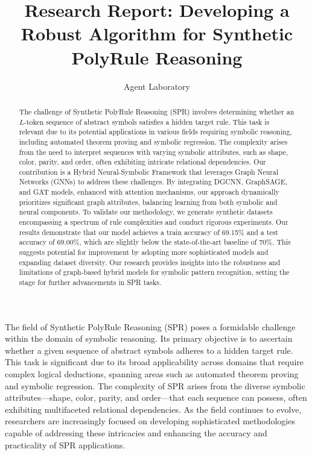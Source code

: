\documentclass{article}
\title{Research Report: Developing a Robust Algorithm for Synthetic PolyRule Reasoning}
\author{Agent Laboratory}
\begin{document}
\maketitle

\begin{abstract}
The challenge of Synthetic PolyRule Reasoning (SPR) involves determining whether an $L$-token sequence of abstract symbols satisfies a hidden target rule. This task is relevant due to its potential applications in various fields requiring symbolic reasoning, including automated theorem proving and symbolic regression. The complexity arises from the need to interpret sequences with varying symbolic attributes, such as shape, color, parity, and order, often exhibiting intricate relational dependencies. Our contribution is a Hybrid Neural-Symbolic Framework that leverages Graph Neural Networks (GNNs) to address these challenges. By integrating DGCNN, GraphSAGE, and GAT models, enhanced with attention mechanisms, our approach dynamically prioritizes significant graph attributes, balancing learning from both symbolic and neural components. To validate our methodology, we generate synthetic datasets encompassing a spectrum of rule complexities and conduct rigorous experiments. Our results demonstrate that our model achieves a train accuracy of 69.15\% and a test accuracy of 69.00\%, which are slightly below the state-of-the-art baseline of 70\%. This suggests potential for improvement by adopting more sophisticated models and expanding dataset diversity. Our research provides insights into the robustness and limitations of graph-based hybrid models for symbolic pattern recognition, setting the stage for further advancements in SPR tasks.
\end{abstract}

The field of Synthetic PolyRule Reasoning (SPR) poses a formidable challenge within the domain of symbolic reasoning. Its primary objective is to ascertain whether a given sequence of abstract symbols adheres to a hidden target rule. This task is significant due to its broad applicability across domains that require complex logical deductions, spanning areas such as automated theorem proving and symbolic regression. The complexity of SPR arises from the diverse symbolic attributes—shape, color, parity, and order—that each sequence can possess, often exhibiting multifaceted relational dependencies. As the field continues to evolve, researchers are increasingly focused on developing sophisticated methodologies capable of addressing these intricacies and enhancing the accuracy and practicality of SPR applications.
\end{document}
